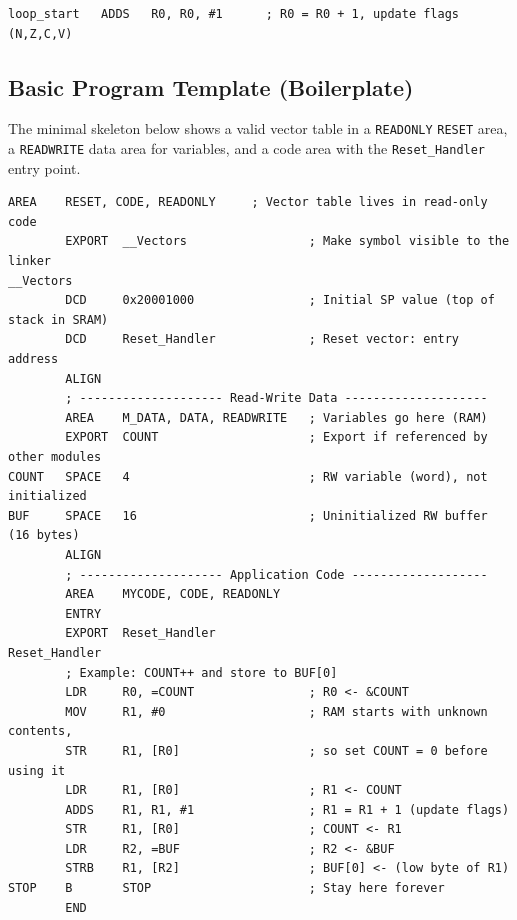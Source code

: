 \begin{lstlisting}[caption={Instruction format example}]
loop_start   ADDS   R0, R0, #1      ; R0 = R0 + 1, update flags (N,Z,C,V)
\end{lstlisting}


\subsection{Basic Program Template (Boilerplate)}

The minimal skeleton below shows a valid vector table in a \texttt{READONLY} \texttt{RESET} area, a \texttt{READWRITE} data area for variables, and a code area with the \texttt{Reset\_Handler} entry point.

\begin{lstlisting}[caption={Cortex-M4 boilerplate with READWRITE data}]
        AREA    RESET, CODE, READONLY     ; Vector table lives in read-only code
        EXPORT  __Vectors                 ; Make symbol visible to the linker
__Vectors
        DCD     0x20001000                ; Initial SP value (top of stack in SRAM)
        DCD     Reset_Handler             ; Reset vector: entry address
        ALIGN        
        ; -------------------- Read-Write Data --------------------
        AREA    M_DATA, DATA, READWRITE   ; Variables go here (RAM)
        EXPORT  COUNT                     ; Export if referenced by other modules
COUNT   SPACE   4                         ; RW variable (word), not initialized
BUF     SPACE   16                        ; Uninitialized RW buffer (16 bytes)
        ALIGN        
        ; -------------------- Application Code -------------------
        AREA    MYCODE, CODE, READONLY
        ENTRY
        EXPORT  Reset_Handler
Reset_Handler
        ; Example: COUNT++ and store to BUF[0]
        LDR     R0, =COUNT                ; R0 <- &COUNT
        MOV     R1, #0                    ; RAM starts with unknown contents,
        STR     R1, [R0]                  ; so set COUNT = 0 before using it
        LDR     R1, [R0]                  ; R1 <- COUNT
        ADDS    R1, R1, #1                ; R1 = R1 + 1 (update flags)
        STR     R1, [R0]                  ; COUNT <- R1        
        LDR     R2, =BUF                  ; R2 <- &BUF
        STRB    R1, [R2]                  ; BUF[0] <- (low byte of R1)
STOP    B       STOP                      ; Stay here forever
        END
\end{lstlisting}

